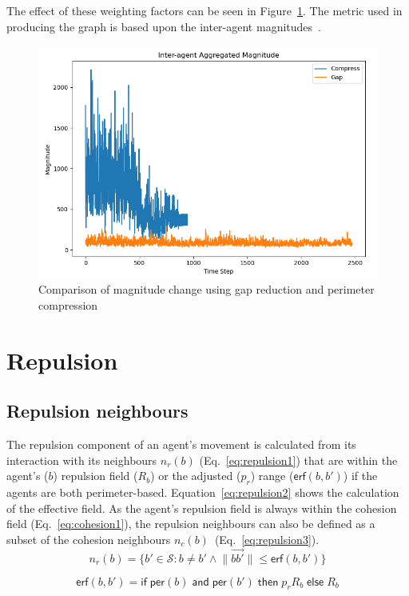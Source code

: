 \documentclass[12pt,a4paper]{article}
\begin{document}
The effect of these weighting factors can be seen in Figure~\ref{fig:compressioneffect1}. The metric used in producing the graph is based upon the inter-agent magnitudes~\cite{eliot2018metric}.

\begin{figure}[H]
	\centering
	\includegraphics[width=0.7\linewidth]{figures/CompressionEffect1}
	\caption[Compression Effect]{Comparison of magnitude change using gap reduction and perimeter compression}
	\label{fig:compressioneffect1}
\end{figure}

\section{Repulsion}\label{repulsion}
\subsection{Repulsion neighbours}\label{repulsion:neighbours}
The repulsion component of an agent's movement is calculated from its interaction with its neighbours $n_r(b)$ (Eq.~\ref{eq:repulsion1}) that are within the agent's ($b$) repulsion field ($R_b$) or the adjusted ($p_r$) range ($\mathsf{erf}(b,b')$) if the agents are both perimeter-based. Equation~\ref{eq:repulsion2} shows the calculation of the effective field. As the agent's repulsion field is always within the cohesion field (Eq.~\ref{eq:cohesion1}), the repulsion neighbours can also be defined as a subset of the cohesion neighbours $n_c(b)$~(Eq.~\ref{eq:repulsion3}).\\

\begin{equation}\label{eq:repulsion1}
n_r(b) = \{b' \in \mathcal{S} : b \neq b' \land \lVert\vec{b b'}\rVert \leq \mathsf{erf}(b,b')\}
\end{equation}

\begin{equation}\label{eq:repulsion2}
\mathsf{erf}(b, b') = \mathsf{if} \;
\mathsf{per}(b) \; \mathsf{and} \; \mathsf{per}(b') \; \mathsf{then} \;
p_rR_b \; \mathsf{else} \; R_b
\end{equation}
\end{document}
